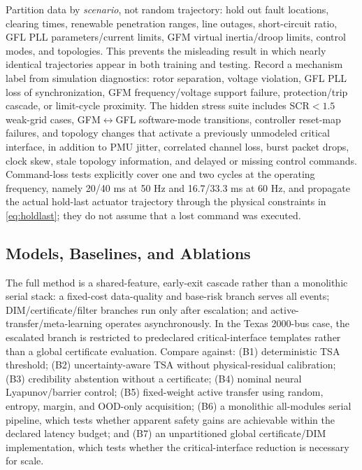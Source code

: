 \documentclass[conference]{IEEEtran}
\begin{document}
Partition data by \emph{scenario}, not random trajectory: hold out fault locations, clearing times, renewable penetration ranges, line outages, short-circuit ratio, GFL PLL parameters/current limits, GFM virtual inertia/droop limits, control modes, and topologies. This prevents the misleading result in which nearly identical trajectories appear in both training and testing. Record a mechanism label from simulation diagnostics: rotor separation, voltage violation, GFL PLL loss of synchronization, GFM frequency/voltage support failure, protection/trip cascade, or limit-cycle proximity. The hidden stress suite includes SCR$<1.5$ weak-grid cases, GFM$\leftrightarrow$GFL software-mode transitions, controller reset-map failures, and topology changes that activate a previously unmodeled critical interface, in addition to PMU jitter, correlated channel loss, burst packet drops, clock skew, stale topology information, and delayed or missing control commands. Command-loss tests explicitly cover one and two cycles at the operating frequency, namely 20/40 ms at 50 Hz and 16.7/33.3 ms at 60 Hz, and propagate the actual hold-last actuator trajectory through the physical constraints in \eqref{eq:holdlast}; they do not assume that a lost command was executed.

\subsection{Models, Baselines, and Ablations}

The full method is a shared-feature, early-exit cascade rather than a monolithic serial stack: a fixed-cost data-quality and base-risk branch serves all events; DIM/certificate/filter branches run only after escalation; and active-transfer/meta-learning operates asynchronously. In the Texas 2000-bus case, the escalated branch is restricted to predeclared critical-interface templates rather than a global certificate evaluation. Compare against: (B1) deterministic TSA threshold; (B2) uncertainty-aware TSA without physical-residual calibration; (B3) credibility abstention without a certificate; (B4) nominal neural Lyapunov/barrier control; (B5) fixed-weight active transfer using random, entropy, margin, and OOD-only acquisition; (B6) a monolithic all-modules serial pipeline, which tests whether apparent safety gains are achievable within the declared latency budget; and (B7) an unpartitioned global certificate/DIM implementation, which tests whether the critical-interface reduction is necessary for scale.
\end{document}
